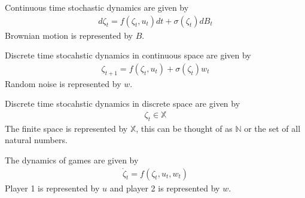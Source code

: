\documentclass[lecture,12pt,]{pcms-l}
\begin{document}
Continuous time stochastic dynamics are given by
\begin{align*}
d\zeta_t = f(\zeta_t,u_t)dt + \sigma(\zeta_t)dB_t
\end{align*}
Brownian motion is represented by $B$.

Discrete time stocahstic dynamics in continuous space are given by
\begin{align*}
\zeta_{t+1} = f(\zeta_t,u_t) + \sigma(\zeta_t)w_t
\end{align*}
Random noise is represented by $w$.

Discrete time stocahstic dynamics in discrete space are given by
\begin{align*}
\zeta_t \in \mathbb{X}
\end{align*}
The finite space is represented by $\mathbb{X}$, this can be thought of as $\mathbb{N}$ or the set of all natural numbers.

The dynamics of games are given by
\begin{align*}
\dot\zeta_t = f(\zeta_t,u_t,w_t)
\end{align*}
Player 1 is represented by $u$ and player 2 is represented by $w$.
\end{document}
